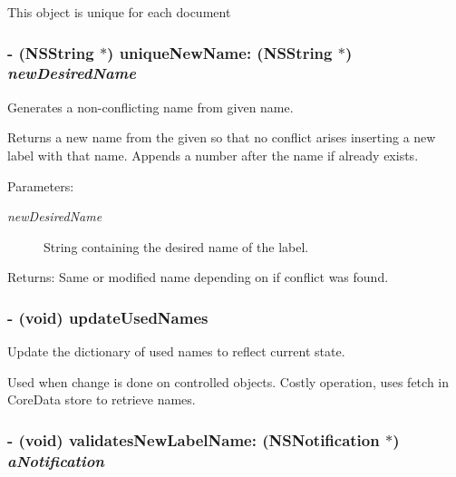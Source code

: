 This object is unique for each document \hypertarget{interface_z_x_label_controller_e223bf8f8bc63f53f0790b34050fee97}{
\subsubsection[{uniqueNewName:}]{\setlength{\rightskip}{0pt plus 5cm}- (NSString $\ast$) uniqueNewName: (NSString $\ast$) {\em newDesiredName}}}
\label{interface_z_x_label_controller_e223bf8f8bc63f53f0790b34050fee97}


Generates a non-conflicting name from given name. 

Returns a new name from the given so that no conflict arises inserting a new label with that name. Appends a number after the name if already exists. \begin{Desc}
\item[Parameters:]
\begin{description}
\item[{\em newDesiredName}]String containing the desired name of the label. \end{description}
\end{Desc}
\begin{Desc}
\item[Returns:]Same or modified name depending on if conflict was found. \end{Desc}
\hypertarget{interface_z_x_label_controller_f3fb09172b4b1ba2bc6ca4a0317ed201}{
\subsubsection[{updateUsedNames}]{\setlength{\rightskip}{0pt plus 5cm}- (void) updateUsedNames }}
\label{interface_z_x_label_controller_f3fb09172b4b1ba2bc6ca4a0317ed201}


Update the dictionary of used names to reflect current state. 

Used when change is done on controlled objects. Costly operation, uses fetch in CoreData store to retrieve names. \hypertarget{interface_z_x_label_controller_50d77144c9045b2f125604b699d474fb}{
\subsubsection[{validatesNewLabelName:}]{\setlength{\rightskip}{0pt plus 5cm}- (void) validatesNewLabelName: (NSNotification $\ast$) {\em aNotification}}}
\label{interface_z_x_label_controller_50d77144c9045b2f125604b699d474fb}


